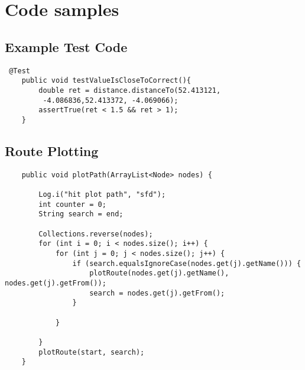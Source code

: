 \chapter{Code samples}
\section{Example Test Code}
\begin{lstlisting}
 @Test
    public void testValueIsCloseToCorrect(){
        double ret = distance.distanceTo(52.413121,
         -4.086836,52.413372, -4.069066);
        assertTrue(ret < 1.5 && ret > 1);
    }
\end{lstlisting}
\section{Route Plotting}
\begin{lstlisting}
    public void plotPath(ArrayList<Node> nodes) {

        Log.i("hit plot path", "sfd");
        int counter = 0;
        String search = end;

        Collections.reverse(nodes);
        for (int i = 0; i < nodes.size(); i++) {
            for (int j = 0; j < nodes.size(); j++) {
                if (search.equalsIgnoreCase(nodes.get(j).getName())) {
                    plotRoute(nodes.get(j).getName(), nodes.get(j).getFrom());
                    search = nodes.get(j).getFrom();
                }

            }

        }
        plotRoute(start, search);
    }
\end{lstlisting}
\newpage
